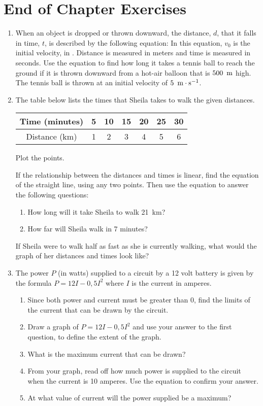 \section{End of Chapter Exercises}
\begin{enumerate}
\item{When an object is dropped or thrown downward, the distance, $d$, that it falls in time, $t$, is described by the following equation:
In this equation, $v_0$ is the initial velocity, in \ms. Distance is measured in meters and time is measured in seconds. Use the equation to find how long it takes a tennis ball to reach the ground if it is thrown downward from a hot-air balloon that is $500~\,\rm{m}$ high. The tennis ball is thrown at an initial velocity of $5~\,\mathrm{m \cdot s^{-1}}$.}

\item{The table below lists the times that Sheila takes to walk the given distances.
\begin{center}
\begin{tabular}{|c|c|c|c|c|c|c|}\hline
Time (minutes)& 5 & 10 & 15 &20 &25 &30\\\hline
Distance (km)& 1 & 2 & 3 & 4 & 5 &6\\\hline
\end{tabular}
\end{center}

Plot the points.

If the relationship between the distances and times is linear, find the equation of the straight line, using any two points. Then use the equation to answer the following questions:
\begin{enumerate}
\item How long will it take Sheila to walk 21~km?
\item How far will Sheila walk in 7 minutes?
\end{enumerate}
If Sheila were to walk half as fast as she is currently walking, what would the graph of her distances and times look like?}

\item{The power $P$ (in watts) supplied to a circuit by a 12 volt battery is given by the formula $P = 12I - 0,5I^2$ where $I$ is the current in amperes.
\begin{enumerate}
\item{Since both power and current must be greater than 0, find the limits of the current that can be drawn by the circuit.}
\item{Draw a graph of $P = 12I - 0,5I^2$ and use your answer to the first question, to define the extent of the graph.}
\item{What is the maximum current that can be drawn?}
\item{From your graph, read off how much power is supplied to the circuit when the current is 10 amperes. Use the equation to confirm your answer.}
\item{At what value of current will the power supplied be a maximum?}
\end{enumerate}
}


\end{enumerate}
